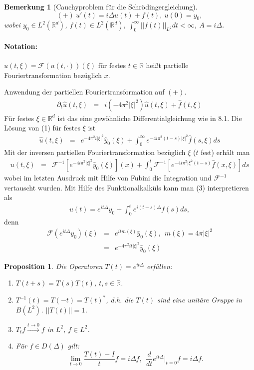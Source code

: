 \documentclass[12pt,a4paper,titlepage]{scrartcl}
\newtheorem{Bemerkung}[Satz]{Bemerkung}
\newtheorem{Prop}[Satz]{Proposition}
\numberwithin{equation}{section}
\newcommand{\R}{\mathbb{R}} %
\newcommand{\f}{\hat{f}}
\newcommand{\F}{\mathcal{F}}
\newcommand{\m}{\cdot}
\newcommand{\laplace}{\Delta}
\begin{document}
	\begin{Bemerkung}[Cauchyproblem für die Schrödingergleichung]
		$$(+)~u'(t) = i\laplace u(t) +f(t),~ u(0) = y_0,$$
		wobei $y_0\in L^2(\R^d)$, $f(t)\in L^2(\R^d)$, $\int_{0}^{\infty}||f(t)||_{L^2}dt<\infty$, $A = i\laplace$.
	\end{Bemerkung}
	
	\paragraph{Notation:} $\hat{u}(t,\xi)  =\F(u(t,\m))(\xi)$ für festes $t\in \R$ heißt partielle Fouriertransformation bezüglich $x$.
	
	Anwendung der partiellen Fouriertransformation auf $(+)$.
	\begin{eqnarray}
		\partial_t \hat u(t,\xi) &=& i(-4\pi^2|\xi|^2)\hat u(t,\xi) +\f(t,\xi) 
	\end{eqnarray}
	Für festes $\xi\in \R^d$ ist das eine gewöhnliche Differentialgleichung wie in 8.1. Die Lösung von (1) für festes $\xi$ ist
	\begin{eqnarray}
		\hat u(t,\xi) &=& e^{-4\pi^2i|\xi|^2}\hat{y}_0(\xi)+\int_{0}^{\infty} e^{-4i\pi^2(t-s)|\xi|^2}\f(s,\xi)ds
	\end{eqnarray}
	Mit der inversen partiellen Fouriertransformation bezüglich $\xi$ ($t$ fest) erhält man
	\begin{eqnarray}
		u(t,\xi) &=& \F^{-1}\left[e^{-4i\pi^2|\xi|^2}\hat{y}_0(\xi) \right](x) +\int_{0}^{t}\F^{-1}\left[e^{-4i\pi^2|\xi^2(t-s)}\f(x,\xi)\right]ds
	\end{eqnarray}
	wobei im letzten Ausdruck mit Hilfe von Fubini die Integration und $\F^{-1}$ vertauscht wurden. Mit Hilfe des Funktionalkalküls kann man (3) interpretieren als
	\begin{eqnarray}
		\boxed{u(t) = e^{it\laplace}y_0 +\int_0^t e^{i(t-s)\laplace}f(s) ds,}
	\end{eqnarray}
	denn
	\begin{eqnarray}
		\F(e^{it\laplace}y_0)(\xi) &=& e^{itm(\xi)}\hat{y}_0(\xi),~~ m(\xi) = 4\pi|\xi|^2\nonumber\\
		&=& e^{-4\pi^2 it|\xi|^2}\hat{y}_0(\xi)\nonumber
	\end{eqnarray}
	
	\begin{Prop}
		Die Operatoren $T(t) = e^{it\laplace}$ erfüllen:
		\begin{enumerate}
			\item[(i)] $T(t+s) = T(s)T(t)$, $t,s\in \R$.
			\item[(ii)] $T^{-1}(t) = T(-t) = T(t)^*$, d.h. die $T(t)$ sind eine unitäre Gruppe in $B(L^{2})$. $||T(t) ||= 1$.
			\item[(iii)] $T_t f\overset{t\rightarrow 0}{\longrightarrow}f$ in $L^2$, $f\in L^2$.
			\item[(iv)] Für $f\in D(\laplace)$ gilt:
			$$\lim\limits_{t\rightarrow 0}\frac{T(t)-I}{t}f = i\laplace f, ~~ \frac{d}{dt}e^{it\laplace}|_{t=0}f = i\laplace f.$$
		\end{enumerate}
	\end{Prop}
	
\end{document}

